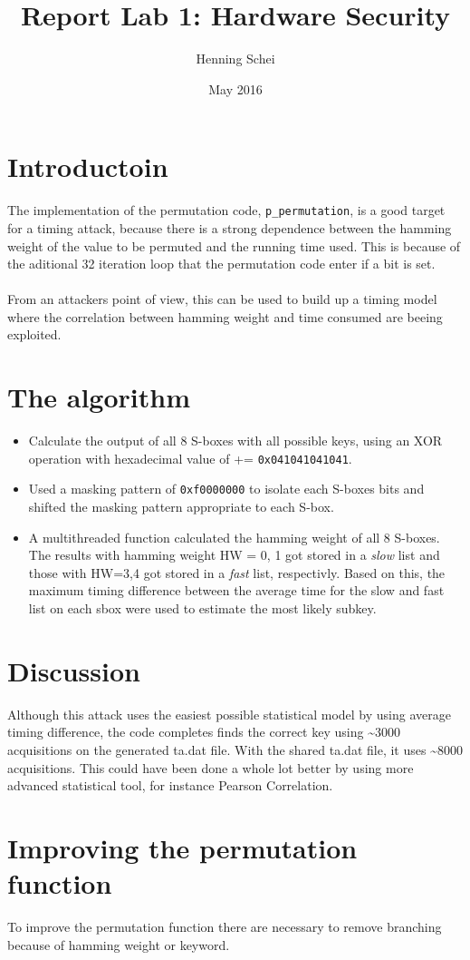 \documentclass{article}
\title{Report Lab 1: Hardware Security}
\author{Henning Schei}
\date{May 2016}
\begin{document}
\maketitle

\section{Introductoin}
The implementation of the permutation code, \texttt{p\_permutation}, is a good target for a timing attack, because there is a strong dependence between the hamming weight of the value to be permuted and the running time used. This is because of the aditional 32 iteration loop that the permutation code enter if a bit is set. \\ \\ From an attackers point of view, this can be used to build up a timing model where the correlation between hamming weight and time consumed are beeing exploited.       

\section{The algorithm}
 
\begin{itemize}
\item Calculate the output of all 8 S-boxes with all possible keys, using an XOR operation with hexadecimal value of += \texttt{0x041041041041}.  
\item  Used a masking pattern of \texttt{0xf0000000} to isolate each S-boxes bits and shifted the masking pattern appropriate to each S-box. 
\item A multithreaded function calculated the hamming weight of all 8 S-boxes. The results with hamming weight HW = 0, 1  got stored in a \emph{slow} list and those with HW=3,4 got stored in a \emph{fast} list, respectivly.  Based on this, the maximum timing difference between the average time for the slow and fast list on each sbox were used to estimate the most likely subkey. 


\end{itemize}


\section{Discussion}
Although this attack uses the easiest possible statistical model by using average timing difference, the code completes finds the correct key using \textasciitilde 3000 acquisitions on the generated ta.dat file. With the shared ta.dat file, it uses \textasciitilde 8000 acquisitions. This could have been done a whole lot better by using more advanced statistical tool, for instance Pearson Correlation. 

\section{Improving the permutation function}
To improve the permutation function there are necessary to remove branching because of hamming weight or keyword.      
\end{document}
